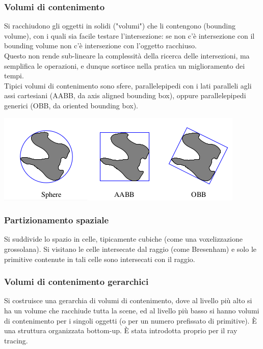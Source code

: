 \documentclass[a4paper, 10pt]{article}
\begin{document}
	\subsubsection{Volumi di contenimento}
		Si racchiudono gli oggetti in solidi ("volumi") che li
		contengono (bounding volume), con i quali sia facile testare
		l’intersezione: se non c’è intersezione con il bounding volume
		non c’è intersezione con l’oggetto racchiuso.\\
		Questo non rende sub-lineare la complessità della ricerca delle
		intersezioni, ma semplifica le operazioni, e dunque sortisce nella
		pratica un miglioramento dei tempi.\\
		Tipici volumi di contenimento sono sfere, parallelepipedi con i
		lati paralleli agli assi cartesiani (AABB, da axis aligned
		bounding box), oppure parallelepipedi generici (OBB, da
		oriented bounding box).\\
		
		\begin{center}
			\includegraphics[scale=0.5]{volumi}
		\end{center}
		
	\subsubsection{Partizionamento spaziale}
		Si suddivide lo spazio in celle, tipicamente cubiche (come una
		voxelizzazione grossolana). Si visitano le celle intersecate dal raggio (come Bresenham) e
		solo le primitive contenute in tali celle sono intersecati con il
		raggio.
		
	\subsubsection{Volumi di contenimento gerarchici}
		Si costruisce una gerarchia di volumi di contenimento, dove al livello più alto si ha un volume che racchiude tutta la scene, ed al livello più basso si hanno volumi di contenimento per i singoli oggetti (o per un numero prefissato di primitive). È una struttura organizzata bottom-up. È stata introdotta proprio per il ray tracing.
		
\end{document}
